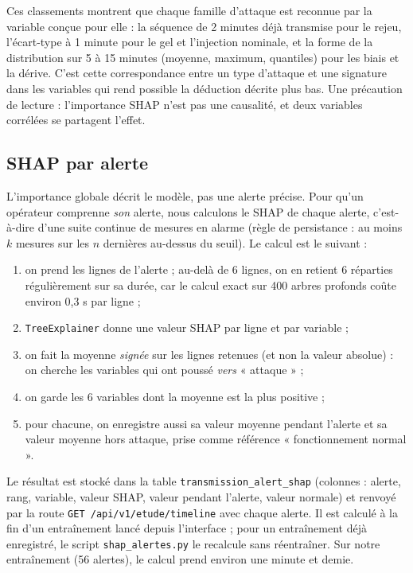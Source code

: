 Ces classements montrent que chaque famille d'attaque est reconnue par la
variable conçue pour elle : la séquence de 2 minutes déjà transmise pour le
rejeu, l'écart-type à 1 minute pour le gel et l'injection nominale, et la forme
de la distribution sur 5 à 15 minutes (moyenne, maximum, quantiles) pour les
biais et la dérive. C'est cette correspondance entre un type d'attaque et une
signature dans les variables qui rend possible la déduction décrite plus bas.
Une précaution de lecture : l'importance SHAP n'est pas une causalité, et deux
variables corrélées se partagent l'effet.

\subsection{SHAP par alerte}
\label{sec:expl_alerte}

L'importance globale décrit le modèle, pas une alerte précise. Pour qu'un
opérateur comprenne \emph{son} alerte, nous calculons le SHAP de chaque alerte,
c'est-à-dire d'une suite continue de mesures en alarme (règle de persistance :
au moins $k$ mesures sur les $n$ dernières au-dessus du seuil). Le calcul est
le suivant :

\begin{enumerate}
  \item on prend les lignes de l'alerte ; au-delà de 6 lignes, on en retient 6
        réparties régulièrement sur sa durée, car le calcul exact sur 400 arbres
        profonds coûte environ 0,3 s par ligne ;
  \item \texttt{TreeExplainer} donne une valeur SHAP par ligne et par variable ;
  \item on fait la moyenne \emph{signée} sur les lignes retenues (et non la
        valeur absolue) : on cherche les variables qui ont poussé \emph{vers}
        « attaque » ;
  \item on garde les 6 variables dont la moyenne est la plus positive ;
  \item pour chacune, on enregistre aussi sa valeur moyenne pendant l'alerte et
        sa valeur moyenne hors attaque, prise comme référence « fonctionnement
        normal ».
\end{enumerate}

Le résultat est stocké dans la table \texttt{transmission\_alert\_shap}
(colonnes : alerte, rang, variable, valeur SHAP, valeur pendant l'alerte,
valeur normale) et renvoyé par la route \texttt{GET /api/v1/etude/timeline}
avec chaque alerte. Il est calculé à la fin d'un entraînement lancé depuis
l'interface ; pour un entraînement déjà enregistré, le script
\texttt{shap\_alertes.py} le recalcule sans réentraîner. Sur notre entraînement
(56 alertes), le calcul prend environ une minute et demie.

